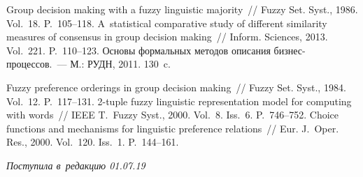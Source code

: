 \begin{multicols}{2}
{{\begin{thebibliography}{99}
 Group decision making with a fuzzy linguistic majority~// Fuzzy Set. 
Syst., 1986. Vol.~18. P.~105--118.
 A~statistical 
comparative study of different similarity measures of consensus in group decision making~// 
Inform. Sciences, 2013. Vol.~221. P.~110--123.
 Основы 
формальных методов описания биз\-нес-про\-цес\-сов.~--- М.: РУДН, 
2011. 130~c.

 Fuzzy preference orderings in group decision making~// Fuzzy Set.  Syst., 
1984. Vol.~12. P.~117--131. 
 2-tuple fuzzy linguistic representation model for computing 
with words~// IEEE T.~Fuzzy Syst., 2000. Vol.~8. Iss.~6. P.~746--752.
 Choice functions and mechanisms for linguistic 
preference relations~// Eur. J.~Oper. Res., 2000. Vol.~120. Iss.~1. P.~144--161.
 \end{thebibliography}

 }
 }

\end{multicols}

\vspace*{-6pt}

\hfill{\small\textit{Поступила в~редакцию 01.07.19}}



\newpage

\vspace*{-28pt}





\def\tit{FORMALIZATION OF~THE~ALTERNATIVES RANKING METHOD FOR~GROUP DECISION MAKING 
IN~SOCIAL NETWORKS}


\def\titkol{Formalization of~the~alternatives ranking method for~group decision making 
in~social networks}

\def\aut{A.\,A.~Gaidamaka$^1$, N.\,V.~Chukhno$^1$, O.\,V.~Chukhno$^1$, 
K.\,E.~Samouylov$^{1,2}$, and~S.\,Ya.~Shorgin$^2$}

\def\autkol{A.\,A.~Gaidamaka, N.\,V.~Chukhno, O.\,V.~Chukhno, et al.} 

